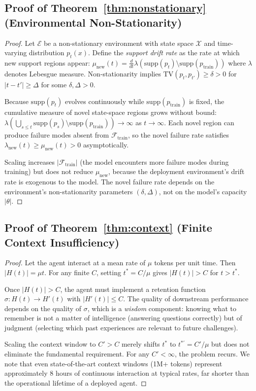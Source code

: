 \documentclass{article}
\begin{document}
\subsection{Proof of Theorem~\ref{thm:nonstationary} (Environmental Non-Stationarity)}
\begin{proof}
Let $\mathcal{E}$ be a non-stationary environment with state space
$\mathcal{X}$ and time-varying distribution $p_t(x)$. Define the
\emph{support drift rate} as the rate at which new support regions appear:
$\mu_{\text{new}}(t) = \frac{d}{dt} \lambda(\text{supp}(p_t) \setminus \text{supp}(p_{\text{train}}))$
where $\lambda$ denotes Lebesgue measure. Non-stationarity implies
$\text{TV}(p_t, p_{t'}) \geq \delta > 0$ for $|t - t'| \geq \Delta$
for some $\delta, \Delta > 0$.

Because $\text{supp}(p_t)$ evolves continuously while
$\text{supp}(p_{\text{train}})$ is fixed, the cumulative measure of novel
state-space regions grows without bound:
$\lambda(\bigcup_{s \leq t} \text{supp}(p_s) \setminus \text{supp}(p_{\text{train}})) \to \infty$ as $t \to \infty$.
Each novel region can produce failure modes absent from
$\mathcal{F}_{\text{train}}$, so the novel failure rate satisfies
$\lambda_{\text{new}}(t) \geq \mu_{\text{new}}(t) > 0$ asymptotically.

Scaling increases $|\mathcal{F}_{\text{train}}|$ (the model encounters
more failure modes during training) but does not reduce
$\mu_{\text{new}}$, because the deployment environment's drift rate
is exogenous to the model. The novel failure rate depends on the
environment's non-stationarity parameters $(\delta, \Delta)$, not on
the model's capacity $|\theta|$.
\end{proof}

\subsection{Proof of Theorem~\ref{thm:context} (Finite Context Insufficiency)}
\begin{proof}
Let the agent interact at a mean rate of $\mu$ tokens per unit time.
Then $|H(t)| = \mu t$. For any finite $C$, setting $t^* = C / \mu$
gives $|H(t)| > C$ for $t > t^*$.

Once $|H(t)| > C$, the agent must implement a retention function
$\sigma: H(t) \to H'(t)$ with $|H'(t)| \leq C$. The quality of
downstream performance depends on the quality of $\sigma$, which
is a \emph{wisdom} component: knowing what to remember is not a
matter of intelligence (answering questions correctly) but of
judgment (selecting which past experiences are relevant to future
challenges).

Scaling the context window to $C' > C$ merely shifts $t^*$ to
$t^{*\prime} = C' / \mu$ but does not eliminate the fundamental
requirement. For any $C' < \infty$, the problem recurs. We note
that even state-of-the-art context windows (1M+ tokens) represent
approximately 8 hours of continuous interaction at typical rates,
far shorter than the operational lifetime of a deployed agent.
\end{proof}
\end{document}
